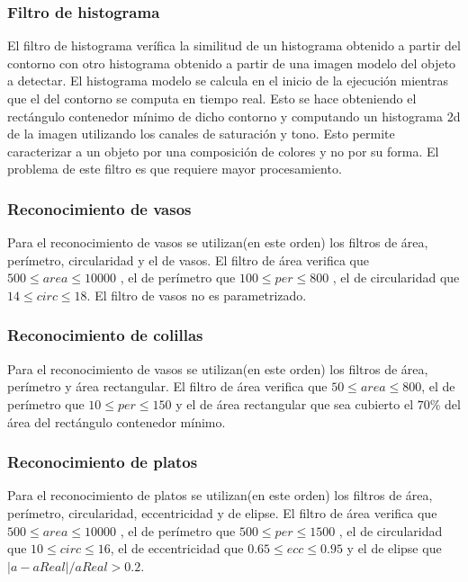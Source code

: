 	\subsubsection*{Filtro de histograma}
	El filtro de histograma verífica la similitud de un histograma obtenido a partir del contorno con otro histograma obtenido a partir de 
	una imagen modelo del objeto a detectar. El histograma modelo se calcula en el inicio de la ejecución mientras que el del contorno se
	computa en tiempo real. Esto se hace obteniendo el rectángulo contenedor mínimo de dicho contorno y computando un histograma 2d de la imagen
	utilizando los canales de saturación y tono. Esto permite caracterizar a un objeto por una composición de colores y no por su forma. El 
	problema de este filtro es que requiere mayor procesamiento.
	
	\subsubsection{Reconocimiento de vasos}
	Para el reconocimiento de vasos se utilizan(en este orden) los filtros de área, perímetro, circularidad y el de vasos.
	El filtro de área verifica que $500 \leq area \leq 10000 $ , el de perímetro que $100 \leq per \leq 800 $ , el de circularidad
	que $14 \leq circ \leq 18$. El filtro de vasos no es parametrizado. 
	
	\subsubsection{Reconocimiento de colillas}
	Para el reconocimiento de vasos se utilizan(en este orden) los filtros de área, perímetro y área rectangular.
	El filtro de área verifica que $50 \leq area \leq 800 $, el de perímetro que $10 \leq per \leq 150 $ y el de área rectangular
	que sea cubierto el $70\%$ del área del rectángulo contenedor mínimo.
	
	\subsubsection{Reconocimiento de platos}
	Para el reconocimiento de platos se utilizan(en este orden) los filtros de área, perímetro, circularidad, eccentricidad y de elipse.
	El filtro de área verifica que $500 \leq area \leq 10000 $ , el de perímetro que $500 \leq per \leq 1500 $ , el de circularidad
	que $10 \leq circ \leq 16$, el de eccentricidad que $0.65 \leq ecc \leq 0.95$ y  el de elipse que $|a-aReal|/ aReal > 0.2$.

